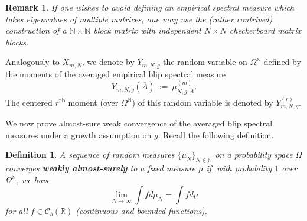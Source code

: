 \documentclass[11pt,reqno]{amsart}
\numberwithin{equation}{section}
\newtheorem{defi}[thm]{Definition}
\theoremstyle{plain}
\newtheorem{rem}[thm]{Remark}
\newcommand{\R}{\ensuremath{\mathbb{R}}}
\newcommand{\N}{\mathbb{N}}
\begin{document}
\begin{rem}\label{rem_stupidblocks}
If one wishes to avoid defining an empirical spectral measure which takes eigenvalues of multiple matrices, one may use the (rather contrived) construction of a $\N \times \N$ block matrix with independent $N \times N$ checkerboard matrix blocks.
\end{rem}

Analogously to $X_{m,N}$, we denote by $Y_{m,N,g}$ the random variable on $\Omega^\N$ defined by the moments of the averaged empirical blip spectral measure
\begin{equation}
Y_{m,N,g}(\overline{A})\ :=\ \mu_{N,g,\overline{A}}^{(m)}.
\end{equation}
The centered $r$\textsuperscript{th} moment (over $\Omega^\N$) of this random variable is denoted by $Y_{m,N,g}^{(r)}$.


We now prove almost-sure weak convergence of the averaged blip spectral measures under a growth assumption on $g$. Recall the following definition.

\begin{defi}
A sequence of random measures $\{\mu_N\}_{N \in \N}$ on a probability space $\Omega$ converges \textbf{weakly almost-surely} to a fixed measure $\mu$ if, with probability $1$ over $\Omega^\N$, we have
\begin{equation}
\lim_{N \rightarrow \infty} \int f d\mu_N = \int f d\mu
\end{equation}
for all $f \in \mathcal{C}_b(\R)$ (continuous and bounded functions).
\end{defi}
\end{document}
